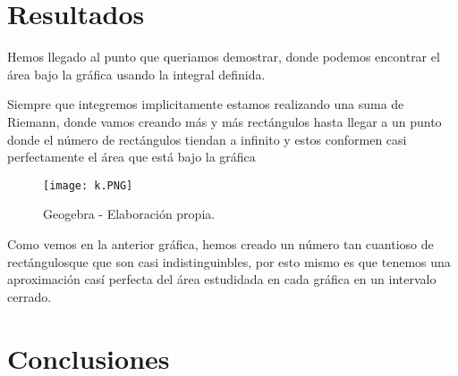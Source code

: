 \documentclass[twocolumn]{article}
\begin{document}
\section{Resultados}
\begin{justify}
  Hemos llegado al punto que queriamos demostrar, donde podemos encontrar el área bajo la gráfica usando la integral definida.
\end{justify}
\begin{justify}
  Siempre que integremos implicitamente estamos realizando una suma de Riemann, donde vamos creando más y más rectángulos hasta llegar a un punto donde el número de rectángulos tiendan a infinito y estos conformen casi perfectamente el área que está bajo la gráfica
\end{justify}

\begin{figure}[H]
  \centering
  \texttt{[image: k.PNG]}
  \caption{Geogebra - Elaboración propia.}  
\end{figure}

\begin{justify}
  Como vemos en la anterior gráfica, hemos creado un número tan cuantioso de rectángulosque que son casi indistinguinbles, por esto mismo es que tenemos una aproximación casí perfecta del área estudidada en cada gráfica en un intervalo cerrado.
\end{justify}

\section{Conclusiones}
\end{document}
